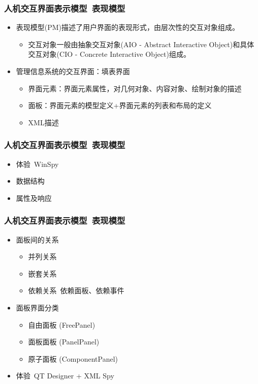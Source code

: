 \documentclass{beamer}
\begin{document}
\begin{frame}
	\frametitle{人机交互界面表示模型~{\small 表现模型}}
	\beamertemplatetransparentcovereddynamicmedium
	\begin{itemize}
		\item 表现模型(PM)描述了用户界面的表现形式，由层次性的交互对象组成。
		\begin{itemize}
			\item 交互对象一般由抽象交互对象(AIO - Abstract Interactive Object)和具体交互对象(CIO - Concrete Interactive Object)组成。
		\end{itemize}
		\pause
		\item 管理信息系统的交互界面：填表界面
		\begin{itemize}
			\item 界面元素：界面元素属性，对几何对象、内容对象、绘制对象的描述
			\item 面板：界面元素的模型定义+界面元素的列表和布局的定义
			\item XML描述
		\end{itemize}
	\end{itemize}
\end{frame}

\begin{frame}
	\frametitle{人机交互界面表示模型~{\small 表现模型}}
	\beamertemplatetransparentcovereddynamicmedium
	\begin{itemize}[<+->]
		\item 体验~{\tiny WinSpy}
		\item 数据结构
		\item 属性及响应
	\end{itemize}
\end{frame}

\begin{frame}
	\frametitle{人机交互界面表示模型~{\small 表现模型}}
	\beamertemplatetransparentcovereddynamicmedium
	\begin{itemize}[<+->]
		\item 面板间的关系
		\begin{itemize}
			\item 并列关系
			\item 嵌套关系
			\item 依赖关系~{\tiny 依赖面板、依赖事件}
		\end{itemize}
		\pause
		\item 面板界面分类
		\begin{itemize}
			\item 自由面板 (FreePanel)
			\item 面板面板 (PanelPanel)
			\item 原子面板 (ComponentPanel)
		\end{itemize}
		\pause
		\item 体验~{\tiny QT Designer + XML Spy}
	\end{itemize}
\end{frame}
\end{document}
